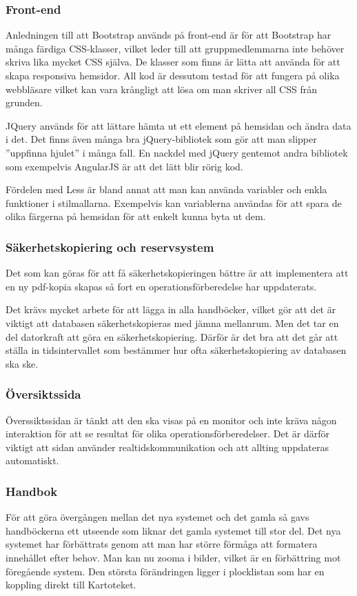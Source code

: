 \documentclass{article}
\begin{document}
\subsubsection{Front-end}
Anledningen till att Bootstrap används på front-end är för att Bootstrap har många färdiga CSS-klasser, vilket leder till att gruppmedlemmarna inte behöver skriva lika mycket CSS själva.
De klasser som finns är lätta att använda för att skapa responsiva hemsidor.
All kod är dessutom testad för att fungera på olika webbläsare vilket kan vara krångligt att lösa om man skriver all CSS från grunden.

JQuery används för att lättare hämta ut ett element på hemsidan och ändra data i det.
Det finns även många bra jQuery-bibliotek som gör att man slipper ''uppfinna hjulet'' i många fall. En nackdel med jQuery gentemot andra bibliotek som exempelvis AngularJS \cite{angular} är att det lätt blir rörig kod.

Fördelen med Less är bland annat att man kan använda variabler och enkla funktioner i stilmallarna.
Exempelvis kan variablerna användas för att spara de olika färgerna på hemsidan för att enkelt kunna byta ut dem.

\subsubsection{Säkerhetskopiering och reservsystem}
Det som kan göras för att få säkerhetskopieringen bättre är att implementera att en ny pdf-kopia skapas så fort en operationsförberedelse har uppdaterats.

Det krävs mycket arbete för att lägga in alla handböcker, vilket gör att det är viktigt att databasen säkerhetskopieras med jämna mellanrum. Men det tar en del datorkraft att göra en säkerhetskopiering. Därför är det bra att det går att ställa in tidsintervallet som bestämmer hur ofta säkerhetskopiering av databasen ska ske.

\subsubsection{Översiktssida}
Överssiktssidan är tänkt att den ska visas på en monitor och inte kräva någon interaktion för att se resultat för olika operationsförberedelser. Det är därför viktigt att sidan använder realtidskommunikation och att allting uppdateras automatiskt. 

\subsubsection{Handbok}
För att göra övergången mellan det nya systemet och det gamla så gavs handböckerna ett utseende som liknar det gamla systemet till stor del. Det nya systemet har förbättrats genom att man har större förmåga att formatera innehållet efter behov. Man kan nu zooma i bilder, vilket är en förbättring mot föregående system.
Den största förändringen ligger i plocklistan som har en koppling direkt till Kartoteket.
\end{document}
